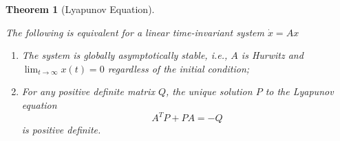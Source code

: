 \documentclass[
]{book}
\newtheorem{theorem}{Theorem}[chapter]
\theoremstyle{definition}
\theoremstyle{definition}
\theoremstyle{definition}
\theoremstyle{definition}
\theoremstyle{remark}
\begin{document}
\begin{theorem}[Lyapunov Equation]
\protect\hypertarget{thm:lyapunovequation}{}\label{thm:lyapunovequation}

The following is equivalent for a linear time-invariant system \(\dot{x} = A x\)

\begin{enumerate}
\def\labelenumi{\arabic{enumi}.}
\item
  The system is globally asymptotically stable, i.e., \(A\) is Hurwitz and \(\lim_{t \rightarrow \infty} x(t) = 0\) regardless of the initial condition;
\item
  For any positive definite matrix \(Q\), the unique solution \(P\) to the Lyapunov equation
  \begin{equation}
  A^T P + P A = -Q
  \label{eq:lyapunov-equation}
  \end{equation}
  is positive definite.
\end{enumerate}

\end{theorem}
\end{document}
